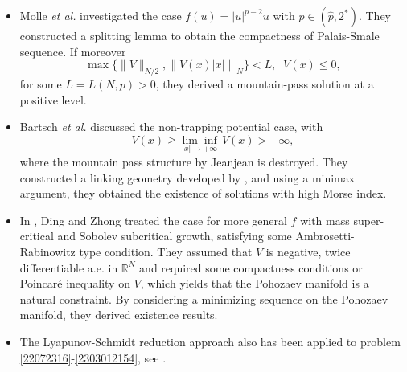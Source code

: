 \documentclass[10pt]{article}
\numberwithin{equation}{section}
\numberwithin{equation}{section}
\begin{document}
\begin{itemize}
\item Molle {\it et al.} \cite{MRV2022} investigated the case $f(u)=|u|^{p-2}u$ with $p\in (\hat{p}, 2^*)$. They constructed a splitting lemma to obtain the compactness of Palais-Smale sequence. If moreover
$$\max\{\|V\|_{N/2}, \left\|V(x)|x|\right\|_N\}<L,\;\; V(x)\le 0,$$
for some $L=L(N, p)>0$, they derived a mountain-pass solution at a positive level.
\item Bartsch {\it et al.} \cite{BMRV2021} discussed the non-trapping potential case, with
\[
V(x)\ge \underset{|x|\to +\infty}{\lim\inf}\,V(x)>-\infty,
\]
where the mountain pass structure by Jeanjean is destroyed. They constructed a linking geometry developed by \cite{BC1990}, and using a minimax argument, they obtained the existence of solutions with high Morse index.
\item In \cite{DZ2022}, Ding and Zhong treated the case for more general $f$ with mass super-critical and Sobolev subcritical growth, satisfying some Ambrosetti-Rabinowitz type condition. They assumed that $V$ is negative, twice differentiable a.e. in $\mathbb{R}^N$ and required some compactness conditions or Poincar\'e inequality on $V$, which yields that the Pohozaev manifold is a natural constraint. By considering a minimizing sequence on the Pohozaev manifold, they derived existence results.
\item The Lyapunov-Schmidt reduction approach also has been applied to problem \eqref{22072316}-\eqref{2303012154}, see \cite[Section 3]{PPVV2021}.
\end{itemize}
\end{document}
